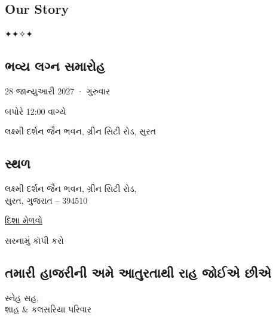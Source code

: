 \label{c1}

\label{d1}

\label{s4}
\subsection{Our Story}\label{our-story}

\label{c2}

\label{d2}

\label{s5}
{✦}{✦}{✧}{✦}

\subsection{ભવ્ય લગ્ન
સમારોહ}\label{uxaaduxab5uxaaf-uxab2uxa97uxaa8-uxab8uxaaeuxab0uxab9}

28 જાન્યુઆરી 2027 · ગુરુવાર

બપોરે 12:00 વાગ્યે

લક્ષ્મી દર્શન જૈન ભવન, ગ્રીન સિટી રોડ, સુરત

\label{s6}
\subsection{સ્થળ}\label{uxab8uxaa5uxab3}

\href{https://maps.app.goo.gl/5eaNSFXfbPsK4VAB8}{}

લક્ષ્મી દર્શન જૈન ભવન, ગ્રીન સિટી રોડ,\\
સુરત, ગુજરાત -- 394510

\href{https://maps.app.goo.gl/5eaNSFXfbPsK4VAB8}{દિશા મેળવો}

સરનામું કૉપી કરો

\label{s7}
\subsection{તમારી હાજરીની અમે આતુરતાથી રાહ જોઈએ
છીએ}\label{uxaa4uxaaeuxab0-uxab9uxa9cuxab0uxaa8-uxa85uxaae-uxa86uxaa4uxab0uxaa4uxaa5-uxab0uxab9-uxa9cuxa88uxa8f-uxa9buxa8f}

સ્નેહ સહ,\\
શાહ \& કલસરિયા પરિવાર

\emph{}

\label{th}
\textbf{}
